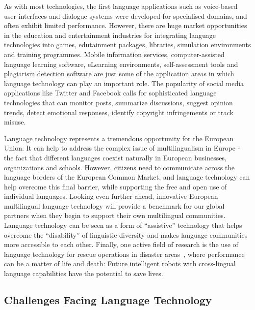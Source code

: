 \begin{multicols}{2}
As with most technologies, the first language applications such as voice-based user interfaces and dialogue systems were developed for specialised domains, and often exhibit limited performance. However, there are huge market opportunities in the education and entertainment industries for integrating language technologies into games, edutainment packages, libraries, simulation environments and training programmes. Mobile information services, computer-assisted language learning software, eLearning environments, self-assessment tools and plagiarism detection software are just some of the application areas in which language technology can play an important role. The popularity of social media applications like Twitter and Facebook calls for sophisticated language technologies that can monitor posts, summarize discussions, suggest opinion trends, detect emotional responses, identify copyright infringements or track misuse.


Language technology represents a tremendous opportunity for the European Union. It can help to address the complex issue of multilingualism in Europe - the fact that different languages coexist naturally in European businesses, organizations and schools. However, citizens need to communicate across the language borders of the European Common Market, and language technology can help overcome this final barrier, while supporting the free and open use of individual languages. Looking even further ahead, innovative European multilingual language technology will provide a benchmark for our global partners when they begin to support their own multilingual communities. Language technology can be seen as a form of ``assistive'' technology that helps overcome the ``disability'' of linguistic diversity and makes language communities more accessible to each other. Finally, one active field of research is the use of language technology for rescue operations in disaster areas~\cite{resnick2011}, where performance can be a matter of life and death: Future intelligent robots with cross-lingual language capabilities have the potential to save lives.

\subsection{Challenges Facing Language Technology}


\end{multicols}
